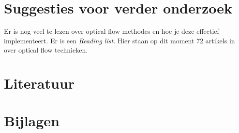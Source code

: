 \documentclass[11pt]{article}
\begin{document}
    \section{Suggesties voor verder onderzoek}
    Er is nog veel te lezen over optical flow methodes en hoe je deze effectief implementeert. Er is een 
    \emph{\citet{Readinglist} Reading list}.
    Hier staan op dit moment 72 artikels in over optical flow technieken.


    \section{Literatuur}
    

    \section{Bijlagen}

    
    
\end{document}
